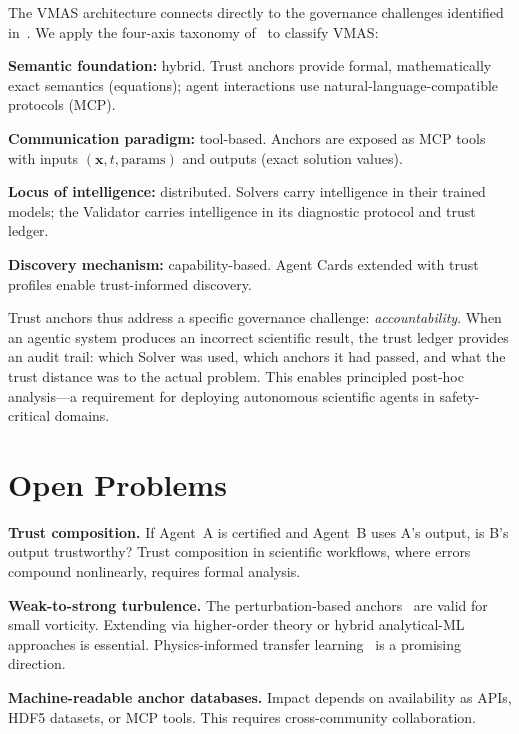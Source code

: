 \documentclass[conference]{IEEEtran}
\begin{document}
The VMAS architecture connects directly to the governance challenges identified in~\cite{PetrovaWoA2025}. We apply the four-axis taxonomy of~\cite{PetrovaWoA2025} to classify VMAS:

\textbf{Semantic foundation:} hybrid. Trust anchors provide formal, mathematically exact semantics (equations); agent interactions use natural-language-compatible protocols (MCP).

\textbf{Communication paradigm:} tool-based. Anchors are exposed as MCP tools with inputs $(\mathbf{x}, t, \mathrm{params})$ and outputs (exact solution values).

\textbf{Locus of intelligence:} distributed. Solvers carry intelligence in their trained models; the Validator carries intelligence in its diagnostic protocol and trust ledger.

\textbf{Discovery mechanism:} capability-based. Agent Cards extended with trust profiles enable trust-informed discovery.

Trust anchors thus address a specific governance challenge: \emph{accountability}. When an agentic system produces an incorrect scientific result, the trust ledger provides an audit trail: which Solver was used, which anchors it had passed, and what the trust distance was to the actual problem. This enables principled post-hoc analysis---a requirement for deploying autonomous scientific agents in safety-critical domains.


\section{Open Problems}

\textbf{Trust composition.} If Agent~A is certified and Agent~B uses A's output, is B's output trustworthy? Trust composition in scientific workflows, where errors compound nonlinearly, requires formal analysis.

\textbf{Weak-to-strong turbulence.} The perturbation-based anchors~\cite{PetrovaShugaev2015,PetrovaShugaev2012} are valid for small vorticity. Extending via higher-order theory or hybrid analytical-ML approaches is essential. Physics-informed transfer learning~\cite{Cuomo2022} is a promising direction.

\textbf{Machine-readable anchor databases.} Impact depends on availability as APIs, HDF5 datasets, or MCP tools. This requires cross-community collaboration.
\end{document}
